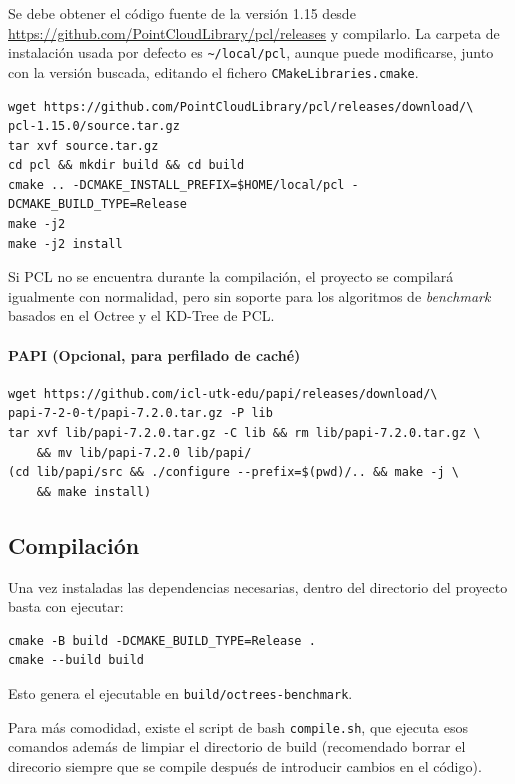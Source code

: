 Se debe obtener el código fuente de la versión 1.15 desde
\url{https://github.com/PointCloudLibrary/pcl/releases} y compilarlo. La
carpeta de instalación usada por defecto es \texttt{\textasciitilde/local/pcl},
aunque puede modificarse, junto con la versión buscada, editando el
fichero \texttt{CMakeLibraries.cmake}.

\begin{verbatim}
wget https://github.com/PointCloudLibrary/pcl/releases/download/\
pcl-1.15.0/source.tar.gz
tar xvf source.tar.gz
cd pcl && mkdir build && cd build
cmake .. -DCMAKE_INSTALL_PREFIX=$HOME/local/pcl -DCMAKE_BUILD_TYPE=Release
make -j2
make -j2 install
\end{verbatim}

Si PCL no se encuentra durante la compilación, el proyecto se compilará
igualmente con normalidad, pero sin soporte para los algoritmos de
\textit{benchmark} basados en el Octree y el KD-Tree de PCL.

\paragraph{PAPI (Opcional, para perfilado de caché)}

\begin{verbatim}
wget https://github.com/icl-utk-edu/papi/releases/download/\
papi-7-2-0-t/papi-7.2.0.tar.gz -P lib
tar xvf lib/papi-7.2.0.tar.gz -C lib && rm lib/papi-7.2.0.tar.gz \
    && mv lib/papi-7.2.0 lib/papi/
(cd lib/papi/src && ./configure --prefix=$(pwd)/.. && make -j \
    && make install)
\end{verbatim}

\subsection{Compilación}

Una vez instaladas las dependencias necesarias, dentro del directorio del
proyecto basta con ejecutar:

\begin{verbatim}
cmake -B build -DCMAKE_BUILD_TYPE=Release .
cmake --build build
\end{verbatim}

Esto genera el ejecutable en \texttt{build/octrees-benchmark}.

Para más comodidad, existe el script de bash \texttt{compile.sh}, que ejecuta esos comandos además de limpiar el directorio de build (recomendado borrar el direcorio siempre que se compile después de introducir cambios en el código).

